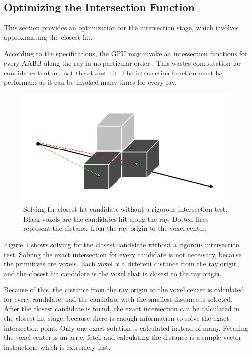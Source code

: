 \documentclass[12pt]{article}
\begin{document}
\subsection{Optimizing the Intersection Function}
\label{sec:OptimizingIntersection}

This section provides an optimization for the intersection stage,
which involves approximating the closest hit.

According to the specifications, the GPU may invoke an intersection functions for every AABB along the ray in no particular order \parencite{DirectX:Specification}.
This wastes computation for candidates that are not the closest hit.
The intersection function must be performant as it can be invoked many times for every ray.

\begin{figure}[H]
    \begin{center}
        \includegraphics[scale=0.22]{ClosestHit-Approx}
    \end{center}
    \caption{
        Solving for closest hit candidate without a rigorous intersection test.
        Black voxels are the candidates hit along the ray.
        Dotted lines represent the distance from the ray origin to the voxel center.
    }
    \label{fig:ClosestHit-Approx}
\end{figure}

Figure \ref{fig:ClosestHit-Approx} shows solving for the closest candidate without a rigorous intersection test.
Solving the exact intersection for every candidate is not necessary, because the primitives are voxels.
Each voxel is a different distance from the ray origin, and the closest hit candidate is the voxel that is closest to the ray origin.

Because of this, the distance from the ray origin to the voxel center is calculated for every candidate, and the candidate with the smallest distance is selected.
After the closest candidate is found, the exact intersection can be calculated in the closest hit stage, because there is enough information to solve the exact intersection point.
Only one exact solution is calculated instead of many.
Fetching the voxel center is an array fetch and calculating the distance is a simple vector instruction, which is extremely fast.
\end{document}

